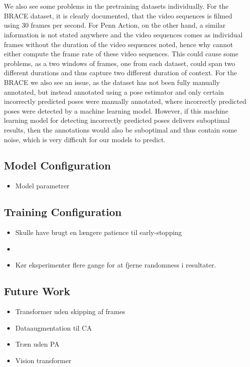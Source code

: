 \documentclass[./main.tex]{subfiles}
\begin{document}
\\
\\
We also see some problems in the pretraining datasets individually. For the BRACE dataset, it is clearly documented, that the video sequences is filmed using 30 frames per second. For Penn Action, on the other hand, a similar information is not stated anywhere and the video sequences comes as individual frames without the duration of the video sequences noted, hence why cannot either compute the frame rate of these video sequences. This could cause some problems, as a two windows of frames, one from each dataset, could span two different durations and thus capture two different duration of context. For the BRACE we also see an issue, as the dataset has not been fully manually annotated, but instead annotated using a pose estimator and only certain incorrectly predicted poses were manually annotated, where incorrectly predicted poses were detected by a machine learning model. However, if this machine learning model for detecting incorrectly predicted poses delivers suboptimal results, then the annotations would also be suboptimal and thus contain some noise, which is very difficult for our models to predict.

\subsection{Model Configuration}
\begin{itemize}
    \item Model parametrer
\end{itemize}

\subsection{Training Configuration}
\begin{itemize}
    \item Skulle have brugt en længere patience til early-stopping
    \item \item Kør eksperimenter flere gange for at fjerne randomness i resultater.
\end{itemize}

\subsection{Future Work}
\begin{itemize}
    \item Transformer uden skipping af frames 
    \item Dataaugmentation til CA
    \item Træn uden PA
    \item Vision transformer
\end{itemize}
\end{document}
